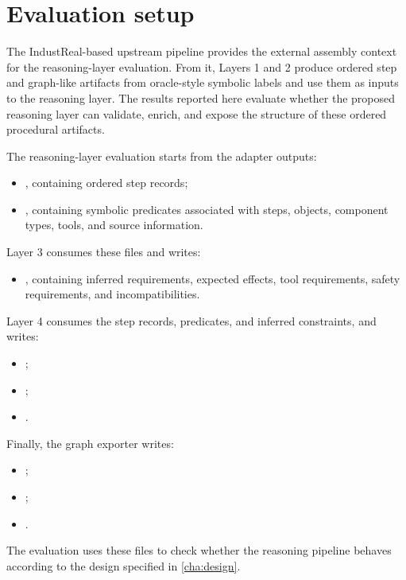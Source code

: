 \section{Evaluation setup}
\label{sec:evaluation-setup}

The IndustReal-based upstream pipeline provides the external assembly context for
the reasoning-layer evaluation. From it, Layers 1 and 2 produce ordered step and graph-like artifacts from oracle-style symbolic labels and use them as inputs to
the reasoning layer. The results reported here evaluate whether the proposed reasoning layer can validate, enrich, and expose the structure of these
ordered procedural artifacts.

The reasoning-layer evaluation starts from the adapter outputs:
\begin{itemize}
    \item {}, containing ordered step records;
    \item {}, containing symbolic predicates associated with steps, objects, component types, tools, and source information.
\end{itemize}

Layer 3 consumes these files and writes:
\begin{itemize}
    \item {}, containing inferred requirements, expected effects, tool requirements, safety requirements, and incompatibilities.
\end{itemize}

Layer 4 consumes the step records, predicates, and inferred constraints, and writes:
\begin{itemize}
    \item {};
    \item {};
    \item {}.
\end{itemize}

Finally, the graph exporter writes:
\begin{itemize}
    \item {};
    \item {};
    \item {}.
\end{itemize}

The evaluation uses these files to check whether the reasoning pipeline behaves according to the design specified in \cref{cha:design}.

